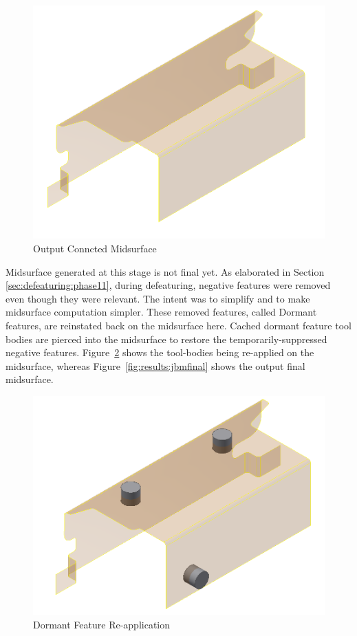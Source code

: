 \begin{figure}[!h]
\centering     %
\includegraphics[width=0.62\linewidth,valign=t]{../Common/images/JBM_UBracket_midsurf_before_dormant_model}
\caption{Output Conncted Midsurface}
\label{fig:results:jbmmidsurf}
\end{figure}


Midsurface generated at this stage is not final yet. As elaborated in Section \ref{sec:defeaturing:phase11}, during defeaturing, negative features were removed even though they were relevant. The intent was to simplify and to make midsurface computation simpler. These removed features, called Dormant features, are reinstated back on the midsurface here. Cached dormant feature tool bodies are pierced into the midsurface to restore the temporarily-suppressed  negative features. Figure~\ref{fig:results:jbmdormant} shows the tool-bodies being re-applied on the midsurface, whereas Figure~\ref{fig:results:jbmfinal} shows the output final midsurface.


\begin{figure}[!h]
\centering     %
\includegraphics[width=0.62\linewidth,valign=t]{../Common/images/JBM_UBracket_midsurf_dormant_model}
\caption{Dormant Feature Re-application}
\label{fig:results:jbmdormant}
\end{figure}

